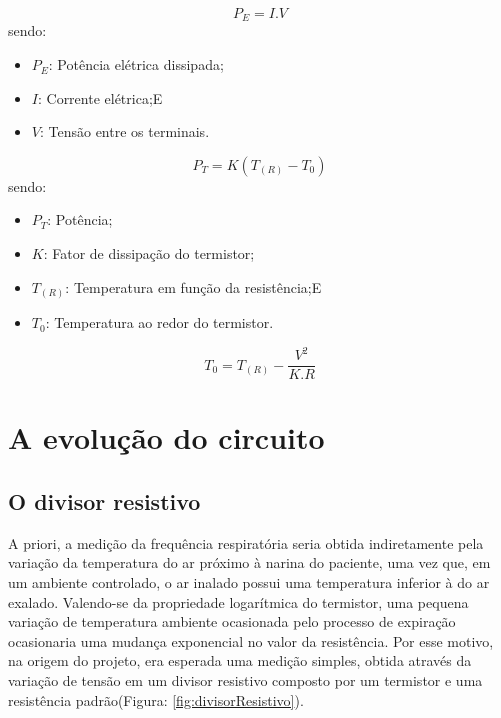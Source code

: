 		\begin{equation}\label{eq:potenciaeletrica}
			P_E = I.V
		\end{equation}
		sendo:
		\begin{itemize}
			\item $P_E$: Potência elétrica dissipada;
			\item $I$: Corrente elétrica;E
			\item $V$: Tensão entre os terminais.
		\end{itemize}

		\begin{equation}\label{eq:potenciatermica}
			P_T = K(T_{(R)} - T_0)
		\end{equation}
		sendo:
		\begin{itemize}
			\item $P_T$: Potência;
			\item $K$: Fator de dissipação do termistor;
			\item $T_{(R)}$: Temperatura em função da resistência;E
			\item $T_0$: Temperatura ao redor do termistor.
		\end{itemize}
		
		\begin{equation} \label{eq:temperaturacomautoaquecimento}
			T_0 = T_{(R)} - \dfrac{V^2}{K.R}
		\end{equation}
		

\section{A evolução do circuito}

\subsection{O divisor resistivo}

A priori, a medição da frequência respiratória seria obtida indiretamente pela variação da temperatura do ar próximo à narina do paciente, uma vez que, em um ambiente controlado, o ar inalado possui uma temperatura inferior à do ar exalado. Valendo-se da propriedade logarítmica do termistor, uma pequena variação de temperatura ambiente ocasionada pelo processo de expiração ocasionaria uma mudança exponencial no valor da resistência. Por esse motivo, na origem do projeto, era esperada uma medição simples, obtida através da variação de tensão em um divisor resistivo composto por um termistor e uma resistência padrão(Figura: \ref{fig:divisorResistivo}).
 
